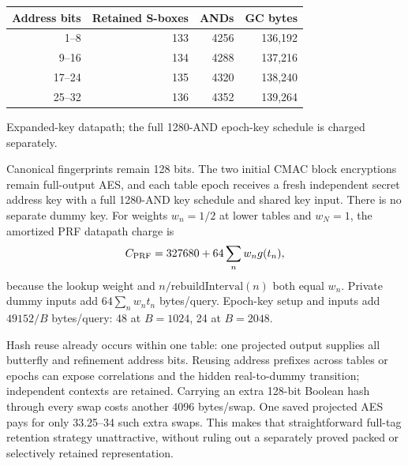 \documentclass[11pt]{article}
\begin{document}
\begin{center}\small
\begin{tabular}{rrrr}\toprule
Address bits & Retained S-boxes & ANDs & GC bytes\\\midrule
1--8 & 133 & 4256 & 136,192\\
9--16 & 134 & 4288 & 137,216\\
17--24 & 135 & 4320 & 138,240\\
25--32 & 136 & 4352 & 139,264\\
\bottomrule\end{tabular}\end{center}
{\footnotesize Expanded-key datapath; the full 1280-AND epoch-key schedule is charged separately.\par}

Canonical fingerprints remain 128 bits. The two initial CMAC block
encryptions remain full-output AES, and each table epoch receives a fresh
independent secret address key with a full 1280-AND key schedule and shared
key input. There is no separate dummy key. For weights $w_n=1/2$ at lower
tables and $w_N=1$, the amortized PRF datapath charge is
\[
 C_{\rm PRF}=327680+64\sum_n w_n g(t_n),
\]
because the lookup weight and $n/\mathrm{rebuildInterval}(n)$ both equal
$w_n$. Private dummy inputs add $64\sum_nw_nt_n$ bytes/query. Epoch-key
setup and inputs add $49152/B$ bytes/query: 48 at $B=1024$, 24 at $B=2048$.

Hash reuse already occurs within one table: one projected output supplies
all butterfly and refinement address bits. Reusing address prefixes across
tables or epochs can expose correlations and the hidden real-to-dummy
transition; independent contexts are retained. Carrying an extra 128-bit
Boolean hash through every swap costs another 4096 bytes/swap. One saved
projected AES pays for only 33.25--34 such extra swaps. This makes that
straightforward full-tag retention strategy unattractive, without ruling
out a separately proved packed or selectively retained representation.
\end{document}
